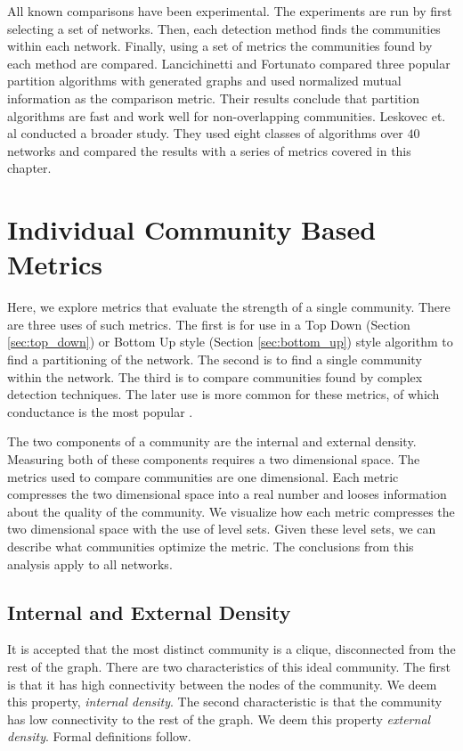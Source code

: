\documentclass[phd,tocprelim]{cornell}
\begin{document}
All known comparisons have been experimental.  The experiments are run by first selecting a set of networks.  Then, each detection method finds the communities within each network.  Finally, using a set of metrics the communities found by each method are compared.  Lancichinetti and Fortunato \cite{lanc:2009} compared three popular partition algorithms with generated graphs and used normalized mutual information as the comparison metric.  Their results conclude that partition algorithms are fast and work well for non-overlapping communities.  Leskovec et. al \cite{leskovec} conducted a broader study.  They used eight classes of algorithms over $40$ networks and compared the results with a series of metrics covered in this chapter.

\section{Individual Community Based Metrics}

Here, we explore metrics that evaluate the strength of a single community.  There are three uses of such metrics.  The first is for use in a Top Down (Section \ref{sec:top_down}) or Bottom Up style (Section \ref{sec:bottom_up}) style algorithm to find a partitioning of the network.  The second is to find a single community within the network.  The third is to compare communities found by complex detection techniques.  The later use is more common for these metrics, of which conductance is the most popular \cite{JTODO}.

The two components of a community are the internal and external density.  Measuring both of these components requires a two dimensional space.  The metrics used to compare communities are one dimensional.  Each metric compresses the two dimensional space into a real number and looses information about the quality of the community.  We visualize how each metric compresses the two dimensional space with the use of level sets.  Given these level sets, we can describe what communities optimize the metric.  The conclusions from this analysis apply to all networks.

\subsection{Internal and External Density}

It is accepted that the most distinct community is a clique, disconnected from the rest of the graph.  There are two characteristics of this ideal community.  The first is that it has high connectivity between the nodes of the community.  We deem this property, {\it internal density}.  The second characteristic is that the community has low connectivity to the rest of the graph.  We deem this property {\it external density}.  Formal definitions follow.
\end{document}
